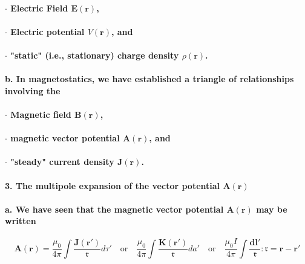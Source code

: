 \documentclass{article}
\begin{document}
\paragraph{\indent $\cdot$ Electric Field $\boldsymbol{E}(\boldsymbol{r})$,}
\paragraph{\indent $\cdot$ Electric potential $V(\boldsymbol{r})$, and }
\paragraph{\indent $\cdot$ "static" (i.e., stationary) charge density $\rho(\boldsymbol{r})$.}
\paragraph{\indent b. In magnetostatics, we have established a triangle of relationships involving the}
\paragraph{\indent $\cdot$ Magnetic field $\boldsymbol{B}(\boldsymbol{r})$,}
\paragraph{\indent $\cdot$ magnetic vector potential $\boldsymbol{A}(\boldsymbol{r})$, and}
\paragraph{\indent $\cdot$ "steady" current density $\boldsymbol{J}(\boldsymbol{r})$.}
\paragraph{3. The multipole expansion of the vector potential $\boldsymbol{A}(\boldsymbol{r})$}
\paragraph{\indent a. We have seen that the magnetic vector potential $\boldsymbol{A}(\boldsymbol{r})$ may be written}
\begin{equation*}
    \boldsymbol{A}(\boldsymbol{r})=\frac{\mu_0}{4\pi}\int\frac{\boldsymbol{J}(\boldsymbol{r'})}{\mathfrak{r}}d\tau'\quad\text{or}\quad\frac{\mu_0}{4\pi}\int\frac{\boldsymbol{K}(\boldsymbol{r}')}{\mathfrak{r}}da'\quad\text{or}\quad\frac{\mu_0I}{4\pi}\int\frac{\boldsymbol{dl}'}{\mathfrak{r}}:\mathfrak{r}=\boldsymbol{r}-\boldsymbol{r}'
\end{equation*}
\end{document}
